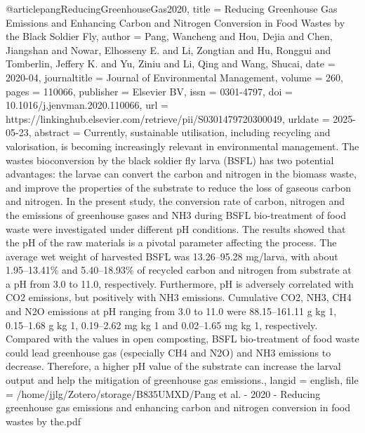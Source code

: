 {{{{@article{pangReducingGreenhouseGas2020,
  title = {Reducing Greenhouse Gas Emissions and Enhancing Carbon and Nitrogen Conversion in Food Wastes by the Black Soldier Fly},
  author = {Pang, Wancheng and Hou, Dejia and Chen, Jiangshan and Nowar, Elhosseny E. and Li, Zongtian and Hu, Ronggui and Tomberlin, Jeffery K. and Yu, Ziniu and Li, Qing and Wang, Shucai},
  date = {2020-04},
  journaltitle = {Journal of Environmental Management},
  volume = {260},
  pages = {110066},
  publisher = {Elsevier BV},
  issn = {0301-4797},
  doi = {10.1016/j.jenvman.2020.110066},
  url = {https://linkinghub.elsevier.com/retrieve/pii/S0301479720300049},
  urldate = {2025-05-23},
  abstract = {Currently, sustainable utilisation, including recycling and valorisation, is becoming increasingly relevant in environmental management. The wastes bioconversion by the black soldier fly larva (BSFL) has two potential advantages: the larvae can convert the carbon and nitrogen in the biomass waste, and improve the properties of the substrate to reduce the loss of gaseous carbon and nitrogen. In the present study, the conversion rate of carbon, nitrogen and the emissions of greenhouse gases and NH3 during BSFL bio-treatment of food waste were investigated under different pH conditions. The results showed that the pH of the raw materials is a pivotal parameter affecting the process. The average wet weight of harvested BSFL was 13.26–95.28 mg/larva, with about 1.95–13.41\% and 5.40–18.93\% of recycled carbon and nitrogen from substrate at a pH from 3.0 to 11.0, respectively. Furthermore, pH is adversely correlated with CO2 emissions, but positively with NH3 emissions. Cumulative CO2, NH3, CH4 and N2O emissions at pH ranging from 3.0 to 11.0 were 88.15–161.11 g kg 1, 0.15–1.68 g kg 1, 0.19–2.62 mg kg 1 and 0.02–1.65 mg kg 1, respectively. Compared with the values in open composting, BSFL bio-treatment of food waste could lead greenhouse gas (especially CH4 and N2O) and NH3 emissions to decrease. Therefore, a higher pH value of the substrate can increase the larval output and help the mitigation of greenhouse gas emissions.},
  langid = {english},
  file = {/home/jjlg/Zotero/storage/B835UMXD/Pang et al. - 2020 - Reducing greenhouse gas emissions and enhancing carbon and nitrogen conversion in food wastes by the.pdf}
}

}}}}
